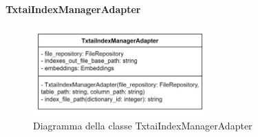\paragraph{TxtaiIndexManagerAdapter} \label{TxtaiIndexManagerAdapter}
\begin{figure}[H]
    \centering
    \includegraphics[width=0.6\textwidth]{assets/Backend/txtai_index_manager_adapter.png}
    \caption{Diagramma della classe TxtaiIndexManagerAdapter}
  \end{figure}
